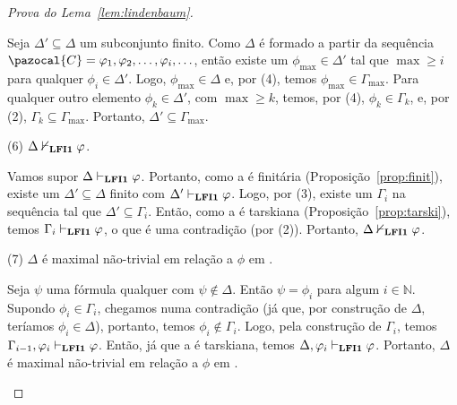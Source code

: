 \begin{proof}[Prova do Lema~\ref{lem:lindenbaum}]
\begin{adjustwidth}{1cm}{}
\begin{adjustwidth}{1cm}{}
                    Seja $\Delta' \subseteq \Delta$ um subconjunto finito. Como $\Delta$ é formado a partir da sequência $\pazocal{C} = \phi_1, \phi_2, \ldots, \phi_i, \ldots$, então existe um $\phi_{\max} \in \Delta'$ tal que $\max \geq i$ para qualquer $\phi_i \in \Delta'$. Logo, $\phi_{\max} \in \Delta$ e, por (4), temos $\phi_{\max} \in \Gamma_{\max}$. Para qualquer outro elemento $\phi_k \in \Delta'$, com $\max \geq k$, temos, por (4), $\phi_k \in \Gamma_k$, e, por (2), $\Gamma_k \subseteq \Gamma_{\max}$. Portanto, $\Delta' \subseteq \Gamma_{\max}$.

                \end{adjustwidth}


                \noindent(6) $\Delta \nvdash_{{\normalfont\textbf{LFI1}}{}} \varphi$.

                \begin{adjustwidth}{1cm}{}
                    Vamos supor $\Delta \vdash_{{\normalfont\textbf{LFI1}}{}} \varphi$. Portanto, como a \lfium{} é finitária (Proposição~\ref{prop:finit}), existe um $\Delta' \subseteq \Delta$ finito com $\Delta' \vdash_{{\normalfont\textbf{LFI1}}{}} \varphi$. Logo, por (3), existe um $\Gamma_i$ na sequência tal que $\Delta' \subseteq \Gamma_i$. Então, como a \lfium{} é tarskiana (Proposição~\ref{prop:tarski}), temos $\Gamma_i \vdash_{{\normalfont\textbf{LFI1}}{}} \varphi$, o que é uma contradição (por (2)). Portanto, $\Delta \nvdash_{{\normalfont\textbf{LFI1}}{}} \varphi$.
                \end{adjustwidth}

                \noindent(7) $\Delta$ é maximal não-trivial em relação a $\phi$ em \lfium{}.
                
                \begin{adjustwidth}{1cm}{}
                    Seja $\psi$ uma fórmula qualquer com $\psi \not \in \Delta$. Então $\psi = \phi_i$ para algum $i \in \mathbb{N}$. Supondo $\phi_i \in \Gamma_i$, chegamos numa contradição (já que, por construção de $\Delta$, teríamos $\phi_i \in \Delta$), portanto, temos $\phi_i \not \in \Gamma_i$. Logo, pela construção de $\Gamma_i$, temos $\Gamma_{i - 1}, \varphi_i \vdash_{{\normalfont\textbf{LFI1}}{}} \varphi$. Então, já que a \lfium{} é tarskiana, temos $\Delta, \varphi_i \vdash_{{\normalfont\textbf{LFI1}}{}} \varphi$. Portanto, $\Delta$ é maximal não-trivial em relação a $\phi$ em \lfium{}.

                \end{adjustwidth}


            \end{adjustwidth}
                
                
            \end{proof}
            
